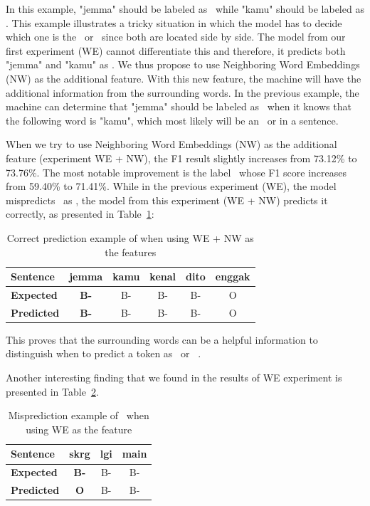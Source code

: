 In this example, "jemma" should be labeled as \greet~while "kamu" should be labeled as \agent. This example illustrates a tricky situation in which the model has to decide which one is the \agent~or \greet~since both are located side by side. The model from our first experiment (WE) cannot differentiate this and therefore, it predicts both "jemma" and "kamu" as \agent. We thus propose to use Neighboring Word Embeddings (NW) as the additional feature. With this new feature, the machine will have the additional information from the surrounding words. In the previous example, the machine can determine that "jemma" should be labeled as \greet~when it knows that the following word is "kamu", which most likely will be an \agent~or \patient in a sentence.

When we try to use Neighboring Word Embeddings (NW) as the additional feature (experiment WE + NW), the F1 result slightly increases from 73.12\% to 73.76\%. The most notable improvement is the label \greet~whose F1 score increases from 59.40\% to 71.41\%. While in the previous experiment (WE), the model mispredicts \greet~as \agent, the model from this experiment (WE + NW) predicts it correctly, as presented in Table~\ref{tab:contohgreetagenttrue}:

\begin{table}
	\centering
	\caption{Correct prediction example of \greet when using WE + NW as the features}
	\label{tab:contohgreetagenttrue}
	\begin{tabular}{|l|ccccc|}
		\hline
		\textbf{Sentence} 				& jemma & kamu & kenal & dito & enggak \\
		\hline
		\textbf{Expected}				& \textbf{B-\greet} & B-\agent & B-\predicate & B-\patient  & O\\
		\hline
		\textbf{Predicted}		& \textbf{B-\greet} & B-\agent & B-\predicate & B-\patient  & O\\
		\hline
	\end{tabular}
\end{table}

This proves that the surrounding words can be a helpful information to distinguish when to predict a token as \greet~or ~\agent.

Another interesting finding that we found in the results of WE experiment is presented in Table~\ref{tab:contohwaktufalse}.

\begin{table}
	\centering
	\caption{Misprediction example of \timesrl~when using WE as the feature}
	\label{tab:contohwaktufalse}
	\begin{tabular}{|l|ccc|}
		\hline
		\textbf{Sentence} 				& skrg & lgi & main \\
		\hline
		\textbf{Expected}				& \textbf{B-\timesrl} & B-\modal & B-\predicate\\
		\hline
		\textbf{Predicted}		& \textbf{O} & B-\modal & B-\predicate \\
		\hline
	\end{tabular}
\end{table}

